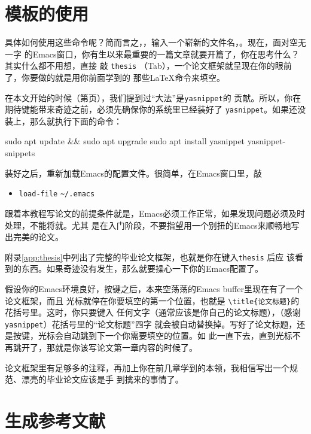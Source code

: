 \section{模板的使用}

具体如何使用这些命令呢？简而言之，\Cx\Cf{}，输入一个崭新的文件名，\Cj{}。现在，面对空无一字
的Emacs窗口，你有生以来最重要的一篇文章就要开篇了，你在思考什么？其实什么都不用想，直接
敲 \texttt{thesis} {\Tab}（Tab），一个论文框架就呈现在你的眼前了，你要做的就是用你前面学到的
那些\LaTeX{}命令来填空。

在本文开始的时候（第\pageref{p:yasnippet}页），我们提到过“{\Tab}大法”是\texttt{yasnippet}的
贡献。所以，你在期待{\Tab}键能带来奇迹之前，必须先确保你的系统里已经装好了
\texttt{yasnippet}。如果还没装上，那么就执行下面的命令\cite{aptitude}：

\begin{codeblock}
  \begin{shellcode}
sudo apt update && sudo apt upgrade
sudo apt install yasnippet yasnippet-snippets
  \end{shellcode}
\end{codeblock}

装好之后，重新加载Emacs的配置文件。很简单，在Emacs窗口里，敲

\begin{itemize}
\item[] \Mx{} \texttt{load-file} \Cj{} \verb'~/.emacs' \Cj{}
\end{itemize}

跟着本教程写论文的前提条件就是，Emacs必须工作正常，如果发现问题必须及时处理，不能将就。尤其
是在入门阶段，不要指望用一个别扭的Emacs来顺畅地写出完美的论文。

附录\ref{app:thesis}中列出了完整的毕业论文框架，也就是你在键入\texttt{thesis} {\Tab}后应
该看到的东西。如果奇迹没有发生，那么就要操心一下你的Emacs配置了。

假设你的Emacs环境良好，按{\Tab}键之后，本来空荡荡的Emacs buffer里现在有了一个论文框架，而且
光标就停在你要填空的第一个位置，也就是 \verb'\title{论文标题}'的花括号里。这时，你只要键入
任何文字（通常应该是你自己的论文标题），（感谢\texttt{yasnippet}）花括号里的“论文标题”四字
就会被自动替换掉。写好了论文标题，还是按{\Tab}键，光标会自动跳到下一个你需要填空的位置。如
此一直{\Tab}下去，直到光标不再跳开了，那就是你该写论文第一章内容的时候了。

论文框架里有足够多的注释，再加上你在前几章学到的本领，我相信写出一个规范、漂亮的毕业论文应该是手
到擒来的事情了。

\section{生成参考文献}

